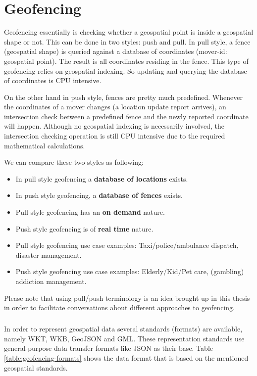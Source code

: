 \documentclass[a4]{report}
\begin{document}
    \chapter{Geofencing}
    Geofencing essentially is checking whether a geospatial point is inside a geospatial shape or not.
    This can be done in two styles: push and pull.
    In pull style, a fence (geospatial shape) is queried against a database of coordinates (mover-id: geospatial point).
    The result is all coordinates residing in the fence.
    This type of geofencing relies on geospatial indexing.
    So updating and querying the database of coordinates is CPU intensive.

    On the other hand in push style, fences are pretty much predefined.
    Whenever the coordinates of a mover changes (a location update report arrives), an intersection check between a
    predefined fence and the newly reported coordinate will happen.
    Although no geospatial indexing is necessarily involved, the intersection checking operation is still CPU
    intensive due to the required mathematical calculations.

    We can compare these two styles as following:
    \begin{itemize}
        \item In pull style geofencing a \textbf{database of locations} exists.
        \item In push style geofencing, a \textbf{database of fences} exists.
        \item Pull style geofencing has an \textbf{on demand} nature.
        \item Push style geofencing is of \textbf{real time} nature.
        \item Pull style geofencing use case examples: Taxi/police/ambulance dispatch, disaster management.
        \item Push style geofencing use case examples: Elderly/Kid/Pet care, (gambling) addiction management.
    \end{itemize}

    Please note that using pull/push terminology is an idea brought up in this thesis in order to facilitate
    conversations about different approaches to geofencing.

    \paragraph{}
    In order to represent geospatial data several standards (formats) are available, namely WKT\cite{WKT}, WKB\cite{wkb},
    GeoJSON\cite{geoJson} and GML\cite{gml}.
    These representation standards use general-purpose data transfer formats like JSON as their base.
    Table \ref{table:geofencing-formats} shows the data format that is based on the mentioned geospatial standards.
\end{document}

